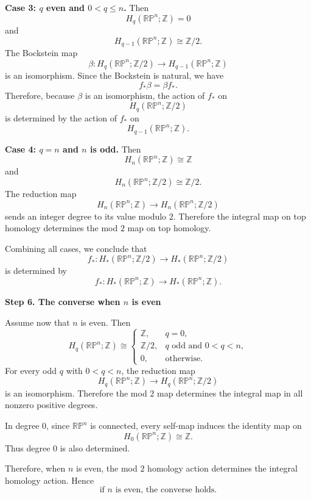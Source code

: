 \begin{solution}
\par

\textbf{Case 3: \(q\) even and \(0<q\le n\).}
Then
\[
H_q(\mathbb{RP}^n;\mathbb Z)=0
\]
and
\[
H_{q-1}(\mathbb{RP}^n;\mathbb Z)\cong \mathbb Z/2.
\]
The Bockstein map
\[
\beta:
H_q(\mathbb{RP}^n;\mathbb Z/2)
\longrightarrow
H_{q-1}(\mathbb{RP}^n;\mathbb Z)
\]
is an isomorphism. Since the Bockstein is natural, we have
\[
f_*\beta=\beta f_*.
\]
Therefore, because \(\beta\) is an isomorphism, the action of \(f_*\) on
\[
H_q(\mathbb{RP}^n;\mathbb Z/2)
\]
is determined by the action of \(f_*\) on
\[
H_{q-1}(\mathbb{RP}^n;\mathbb Z).
\]

\par

\textbf{Case 4: \(q=n\) and \(n\) is odd.}
Then
\[
H_n(\mathbb{RP}^n;\mathbb Z)\cong \mathbb Z
\]
and
\[
H_n(\mathbb{RP}^n;\mathbb Z/2)\cong \mathbb Z/2.
\]
The reduction map
\[
H_n(\mathbb{RP}^n;\mathbb Z)
\longrightarrow
H_n(\mathbb{RP}^n;\mathbb Z/2)
\]
sends an integer degree to its value modulo \(2\). Therefore the integral map on top homology determines the mod \(2\) map on top homology.

Combining all cases, we conclude that
\[
\boxed{
	f_*:H_*(\mathbb{RP}^n;\mathbb Z/2)
	\longrightarrow
	H_*(\mathbb{RP}^n;\mathbb Z/2)
}
\]
is determined by
\[
\boxed{
	f_*:H_*(\mathbb{RP}^n;\mathbb Z)
	\longrightarrow
	H_*(\mathbb{RP}^n;\mathbb Z).
}
\]


\medskip
\noindent\textbf{Step 6. The converse when \(n\) is even}\par
\smallskip


Assume now that \(n\) is even. Then
\[
H_q(\mathbb{RP}^n;\mathbb Z)
\cong
\begin{cases}
	\mathbb Z, & q=0,\\[1mm]
	\mathbb Z/2, & q \text{ odd and }0<q<n,\\[1mm]
	0, & \text{otherwise}.
\end{cases}
\]
For every odd \(q\) with \(0<q<n\), the reduction map
\[
H_q(\mathbb{RP}^n;\mathbb Z)
\longrightarrow
H_q(\mathbb{RP}^n;\mathbb Z/2)
\]
is an isomorphism. Therefore the mod \(2\) map determines the integral map in all nonzero positive degrees.

In degree \(0\), since \(\mathbb{RP}^n\) is connected, every self-map induces the identity map on
\[
H_0(\mathbb{RP}^n;\mathbb Z)\cong \mathbb Z.
\]
Thus degree \(0\) is also determined.

Therefore, when \(n\) is even, the mod \(2\) homology action determines the integral homology action. Hence
\[
\boxed{
	\text{if }n\text{ is even, the converse holds.}
}
\]



\end{solution}
